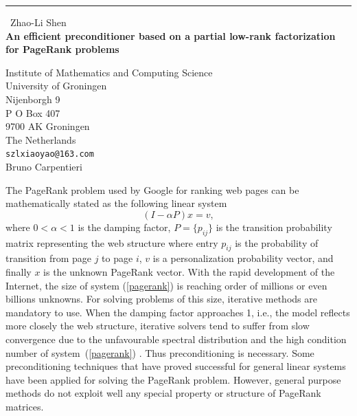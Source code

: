 \documentclass{report}
\begin{document}
\begin{center}
\rule{6in}{1pt} \
{\large Zhao-Li Shen \\
{\bf An efficient preconditioner based on a partial low-rank factorization for PageRank problems}}

Institute of Mathematics and Computing Science \\ University of Groningen \\ Nijenborgh 9 \\ P O Box 407 \\ 9700 AK Groningen \\ The Netherlands
\\
{\tt szlxiaoyao@163.com}\\
Bruno Carpentieri\end{center}

The PageRank problem used by Google for ranking web pages can be
mathematically stated as the following linear system
\begin{equation}\label{pagerank}
(I-\alpha P)x=v,
\end{equation}
where $0<\alpha<1$ is the damping factor, $P=\{p_{ij}\}$ is the
transition probability matrix representing the web structure where entry
$p_{ij}$ is the probability of transition from page $j$ to page $i$, $v$
is a personalization probability vector, and finally $x$ is the unknown
PageRank vector. With the rapid development of the Internet, the size of
system (\ref{pagerank}) is reaching order of millions or even billions
unknowns. For solving problems of this size, iterative methods are
mandatory to use. When the damping factor approaches 1, i.e., the model
reflects more closely the web structure, iterative solvers tend to suffer
from slow convergence due to the unfavourable spectral distribution and
the high condition number of system~(\ref{pagerank}) \cite{ref1,ref2}.
Thus preconditioning is necessary. Some preconditioning techniques that
have proved successful for general linear systems have been applied for
solving the PageRank problem. However, general purpose methods do not
exploit well any special property or structure of PageRank matrices.
\end{document}
